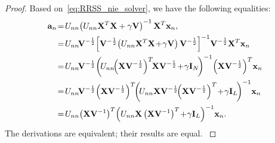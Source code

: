 \documentclass[a4paper]{article}
\begin{document}
\begin{proof}Based on\ \eqref{eq:RRSS_nie_solver}, we have the
following equalities: 
\begin{align*}
\mtbfa_{n}\! & =\! U_{nn}\!\left(U_{nn}\mtbfX^{T}\mtbfX+\gamma\mtbfV\right)^{-1}\mtbfX^{T}\mtbfx_{n},\\
 & =\! U_{nn}\!\mtbfV^{-\frac{1}{2}}\!\left[\mtbfV^{-\frac{1}{2}}\!\left(U_{nn}\mtbfX^{T}\mtbfX\!+\!\gamma\mtbfV\right)\mtbfV^{-\frac{1}{2}}\right]^{-1}\!\mtbfV^{-\frac{1}{2}}\mtbfX^{T}\mtbfx_{n}\\
 & =\! U_{nn}\!\mtbfV^{-\frac{1}{2}}\!\left(\! U_{nn}\!\!\left(\mtbfX\mtbfV^{-\frac{1}{2}}\right)^{T}\!\!\mtbfX\mtbfV^{-\frac{1}{2}}\!+\!\gamma\mtbfI_{N}\!\right)^{-1}\!\left(\mtbfX\mtbfV^{-\frac{1}{2}}\right)^{T}\!\mtbfx_{n}\\
 & =\! U_{nn}\!\mtbfV^{-\frac{1}{2}}\!\left(\mtbfX\mtbfV^{-\frac{1}{2}}\right)^{T}\!\!\left(\! U_{nn}\mtbfX\mtbfV^{-\frac{1}{2}}\!\!\left(\mtbfX\mtbfV^{-\frac{1}{2}}\right)^{T}\!+\!\gamma\mtbfI_{L}\!\right)^{-1}\!\mtbfx_{n}\\
 & =\! U_{nn}\!\left(\mtbfX\mtbfV^{-1}\right)^{T}\!\left(U_{nn}\mtbfX\left(\mtbfX\mtbfV^{-1}\right)^{T}\!+\!\gamma\mtbfI_{L}\right)^{-1}\!\mtbfx_{n}.
\end{align*}
{\small{The derivations are equivalent; their results are equal. }}\end{proof}
\end{document}
